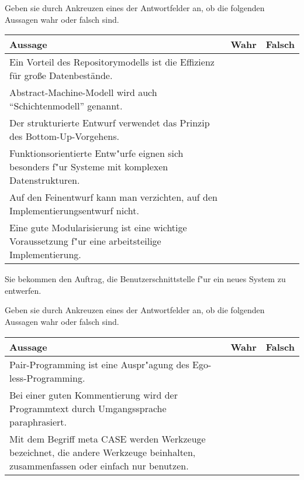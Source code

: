 \documentclass[12pt]{exam}
\begin{document}
\begin{questions}
\question[6] Geben sie durch Ankreuzen eines der Antwortfelder an, ob die folgenden Aussagen wahr oder falsch sind. \\
\addpoints
\begin{tabular}{| p{12cm} | l | l |} \hline
    Aussage & Wahr & Falsch \\ \hline
    Ein Vorteil des Repositorymodells ist die Effizienz für große Datenbestände. & & \\ \hline
    Abstract-Machine-Modell wird auch "`Schichtenmodell"' genannt. & & \\ \hline
    Der strukturierte Entwurf verwendet das Prinzip des Bottom-Up-Vorgehens. & & \\ \hline
    Funktionsorientierte Entw"urfe eignen sich besonders f"ur Systeme mit komplexen Datenstrukturen. & & \\ \hline
    Auf den Feinentwurf kann man verzichten, auf den Implementierungsentwurf nicht. & & \\ \hline
    Eine gute Modularisierung ist eine wichtige Voraussetzung f"ur eine arbeitsteilige Implementierung. & & \\ \hline
\end{tabular}

\question[3] Sie bekommen den Auftrag, die Benutzerschnittstelle f"ur ein neues System zu entwerfen.
\noaddpoints
{}

\question[3] Geben sie durch Ankreuzen eines der Antwortfelder an, ob die folgenden Aussagen wahr oder falsch sind. \\
\addpoints
\begin{tabular}{| p{12cm} | l | l |} \hline
    Aussage & Wahr & Falsch \\ \hline
    Pair-Programming ist eine Auspr"agung des Ego-less-Programming. & & \\ \hline
    Bei einer guten Kommentierung wird der Programmtext durch Umgangssprache paraphrasiert. & & \\ \hline
    Mit dem Begriff meta CASE werden Werkzeuge bezeichnet, die andere Werkzeuge beinhalten, zusammenfassen oder einfach nur benutzen. & & \\ \hline
\end{tabular}


\end{questions}
\end{document}
